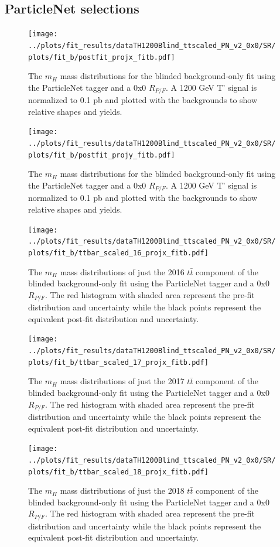 \documentclass[10pt,oneside]{article}
\begin{document}
\subsection{ParticleNet selections}
\begin{figure}[H]
    \centering
    \texttt{[image: ../plots/fit\_results/dataTH1200Blind\_ttscaled\_PN\_v2\_0x0/SR/plots/fit\_b/postfit\_projx\_fitb.pdf]}
    \caption{The $m_H$ mass distributions for the blinded background-only fit using the ParticleNet tagger and a 0x0 $R_{P/F}$.
    A 1200 GeV T' signal is normalized to 0.1 pb and plotted with the backgrounds to show relative shapes and yields.}
    \label{figs:PN_mh}
\end{figure}
\begin{figure}[H]
    \centering
    \texttt{[image: ../plots/fit\_results/dataTH1200Blind\_ttscaled\_PN\_v2\_0x0/SR/plots/fit\_b/postfit\_projy\_fitb.pdf]}
    \caption{The $m_H$ mass distributions for the blinded background-only fit using the ParticleNet tagger and a 0x0 $R_{P/F}$.
    A 1200 GeV T' signal is normalized to 0.1 pb and plotted with the backgrounds to show relative shapes and yields.}
    \label{figs:PN_mth}
\end{figure}
\begin{figure}[H]
    \centering
    \texttt{[image: ../plots/fit\_results/dataTH1200Blind\_ttscaled\_PN\_v2\_0x0/SR/plots/fit\_b/ttbar\_scaled\_16\_projx\_fitb.pdf]}
    \caption{The $m_H$ mass distributions of just the 2016 $t\bar{t}$ component of the blinded background-only fit using the ParticleNet tagger and a 0x0 $R_{P/F}$.
    The red histogram with shaded area represent the pre-fit distribution and uncertainty while the black points represent the equivalent
    post-fit distribution and uncertainty.}
    \label{figs:PN_mth_tt16}
\end{figure}
\begin{figure}[H]
    \centering
    \texttt{[image: ../plots/fit\_results/dataTH1200Blind\_ttscaled\_PN\_v2\_0x0/SR/plots/fit\_b/ttbar\_scaled\_17\_projx\_fitb.pdf]}
    \caption{The $m_H$ mass distributions of just the 2017 $t\bar{t}$ component of the blinded background-only fit using the ParticleNet tagger and a 0x0 $R_{P/F}$.
    The red histogram with shaded area represent the pre-fit distribution and uncertainty while the black points represent the equivalent
    post-fit distribution and uncertainty.}
    \label{figs:PN_mth_tt17}
\end{figure}
\begin{figure}[H]
    \centering
    \texttt{[image: ../plots/fit\_results/dataTH1200Blind\_ttscaled\_PN\_v2\_0x0/SR/plots/fit\_b/ttbar\_scaled\_18\_projx\_fitb.pdf]}
    \caption{The $m_H$ mass distributions of just the 2018 $t\bar{t}$ component of the blinded background-only fit using the ParticleNet tagger and a 0x0 $R_{P/F}$.
    The red histogram with shaded area represent the pre-fit distribution and uncertainty while the black points represent the equivalent
    post-fit distribution and uncertainty.}
    \label{figs:PN_mth_tt18}
\end{figure}
\end{document}
